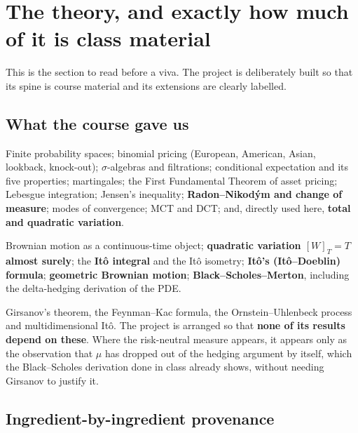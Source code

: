 \documentclass[11pt,a4paper]{article}
\begin{document}
\section{The theory, and exactly how much of it is class material}
\label{sec:theory}

This is the section to read before a viva. The project is deliberately built so that its spine
is course material and its extensions are clearly labelled.

\subsection{What the course gave us}

\begin{thmbox}
Finite probability spaces; binomial pricing (European, American, Asian, lookback, knock-out);
$\sigma$-algebras and filtrations; conditional expectation and its five properties;
martingales; the First Fundamental Theorem of asset pricing; Lebesgue integration; Jensen's
inequality; \textbf{Radon--Nikod\'ym and change of measure}; modes of convergence; MCT and DCT;
and, directly used here, \textbf{total and quadratic variation}.
\end{thmbox}

\begin{thmbox}
Brownian motion as a continuous-time object; \textbf{quadratic variation $[W]_T=T$ almost
surely}; the \textbf{It\^o integral} and the It\^o isometry; \textbf{It\^o's (It\^o--Doeblin)
formula}; \textbf{geometric Brownian motion}; \textbf{Black--Scholes--Merton}, including the
delta-hedging derivation of the PDE.
\end{thmbox}

\begin{trapbox}
Girsanov's theorem, the Feynman--Kac formula, the Ornstein--Uhlenbeck process and
multidimensional It\^o. The project is arranged so that \textbf{none of its results depend on
these}. Where the risk-neutral measure appears, it appears only as the observation that $\mu$
has dropped out of the hedging argument by itself, which the Black--Scholes derivation done
in class already shows, without needing Girsanov to justify it.
\end{trapbox}

\subsection{Ingredient-by-ingredient provenance}
\end{document}
